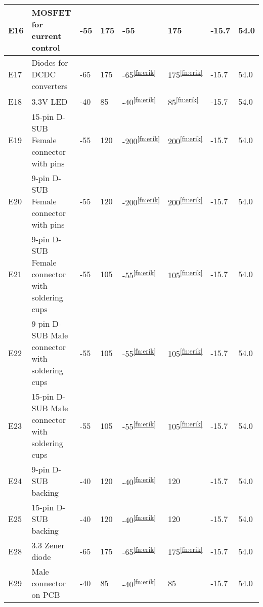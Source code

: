 \begin{longtable}{|m{1cm}|m{3.5cm}|m{1.3cm}|m{1.3cm}|m{1.4cm}|m{1.3cm}|m{1.3cm}|m{1.3cm}|}
E16 & MOSFET for current control & -55 & 175 & -55 & 175 & -15.7 & 54.0 \\ \hline
E17 & Diodes for DCDC converters & -65 & 175 & -65\textsuperscript{\ref{fn:erik}} & 175\textsuperscript{\ref{fn:erik}} & -15.7 & 54.0 \\ \hline
E18 & 3.3V LED & -40 & 85 & -40\textsuperscript{\ref{fn:erik}} & 85\textsuperscript{\ref{fn:erik}} & -15.7 & 54.0 \\ \hline 
E19 & 15-pin D-SUB Female connector with pins & -55 & 120 & -200\textsuperscript{\ref{fn:erik}} & 200\textsuperscript{\ref{fn:erik}} & -15.7 & 54.0 \\ \hline
E20 & 9-pin D-SUB Female connector with pins & -55 & 120  & -200\textsuperscript{\ref{fn:erik}} & 200\textsuperscript{\ref{fn:erik}} & -15.7 & 54.0 \\ \hline
E21 & 9-pin D-SUB Female connector with soldering cups & -55 & 105 & -55\textsuperscript{\ref{fn:erik}} & 105\textsuperscript{\ref{fn:erik}} & -15.7 & 54.0 \\ \hline
E22 & 9-pin D-SUB Male connector with soldering cups & -55 & 105 & -55\textsuperscript{\ref{fn:erik}} & 105\textsuperscript{\ref{fn:erik}} & -15.7 & 54.0 \\ \hline
E23 & 15-pin D-SUB Male connector with soldering cups & -55  & 105 & -55\textsuperscript{\ref{fn:erik}} & 105\textsuperscript{\ref{fn:erik}} & -15.7 & 54.0 \\ \hline
E24 & 9-pin D-SUB backing & -40 & 120 & -40\textsuperscript{\ref{fn:erik}} & 120 & -15.7 & 54.0  \\ \hline
E25 & 15-pin D-SUB backing & -40 & 120 & -40\textsuperscript{\ref{fn:erik}} & 120 & -15.7 & 54.0  \\ \hline
E28 & 3.3 Zener diode & -65 & 175 & -65\textsuperscript{\ref{fn:erik}} & 175\textsuperscript{\ref{fn:erik}} & -15.7 & 54.0 \\ \hline
E29 & Male connector on PCB & -40 & 85 & -40\textsuperscript{\ref{fn:erik}} & 85 & -15.7 & 54.0 \\ \hline

\end{longtable}

